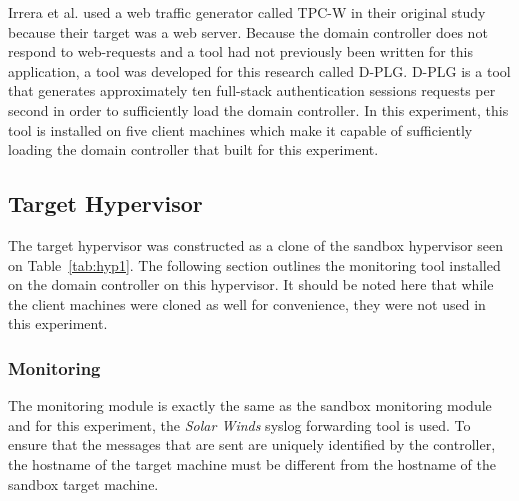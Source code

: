 Irrera et al. used a web traffic generator called TPC-W in their original study
because their target was a web server.  Because the domain controller does not
respond to web-requests and a tool had not previously been written for this
application, a tool was developed for this research called D-PLG. D-PLG is a
tool that generates approximately ten full-stack authentication sessions
requests per second in order to sufficiently load the domain controller.  In
this experiment, this tool is installed on five client machines which make it
capable of sufficiently loading the domain controller that built for this
experiment.

\subsection{Target Hypervisor} \label{sec:target}
The target hypervisor was constructed as a clone of the sandbox hypervisor seen
on Table~\ref{tab:hyp1}.  The following section outlines the monitoring tool
installed on the domain controller on this hypervisor.  It should be noted here
that while the client machines were cloned as well for convenience, they were
not used in this experiment.

\subsubsection{Monitoring} \label{sec:targetMonitoringTool}
The monitoring module is exactly the same as the sandbox monitoring module and
for this experiment, the \emph{Solar Winds} syslog forwarding tool is used.  To
ensure that the messages that are sent are uniquely identified by the
controller, the hostname of the target machine must be different from the
hostname of the sandbox target machine.

\setcounter{secnumdepth}{1}

